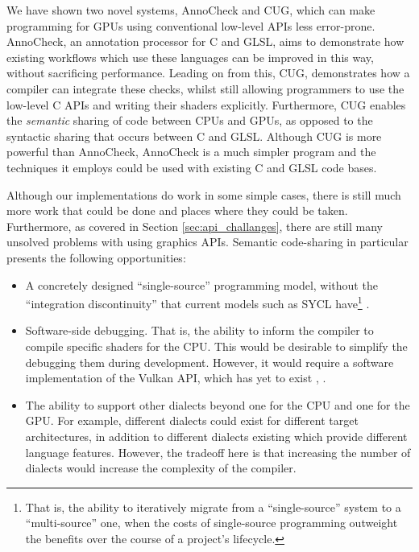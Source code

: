 \documentclass[a4paper,12pt,twoside,openright]{report}
\begin{document}

We have shown two novel systems, AnnoCheck and CUG, which can make programming
for GPUs using conventional low-level APIs less error-prone. AnnoCheck, an
annotation processor for C and GLSL, aims to demonstrate how existing workflows
which use these languages can be improved in this way, without sacrificing
performance. Leading on from this, CUG, demonstrates how a compiler can
integrate these checks, whilst still allowing programmers to use the low-level
C APIs and writing their shaders explicitly. Furthermore, CUG enables the
\textit{semantic} sharing of code between CPUs and GPUs, as opposed to the
syntactic sharing that occurs between C and GLSL. Although CUG is more powerful
than AnnoCheck, AnnoCheck is a much simpler program and the techniques it
employs could be used with existing C and GLSL code bases.

Although our implementations do work in some simple cases, there is still much
more work that could be done and places where they could be taken. Furthermore,
as covered in Section \ref{sec:api_challanges}, there are still many unsolved
problems with using graphics APIs. Semantic code-sharing in particular presents
the following opportunities:

\begin{itemize}

    \item A concretely designed ``single-source'' programming model, without
    the ``integration discontinuity'' that current models such as SYCL
    have\footnote{That is, the ability to iteratively migrate from a
    ``single-source'' system to a ``multi-source'' one, when the costs of
    single-source programming outweight the benefits over the course of a
    project's lifecycle.} \cite{DesignAndEvaluateReusableComponents}.

    \item Software-side debugging. That is, the ability to inform the compiler
    to compile specific shaders for the CPU. This would be desirable to
    simplify the debugging them during development. However, it would require a
    software implementation of the Vulkan API, which has yet to exist
    \cite{VulkanCPU} \cite{Kazan}, \cite{SwiftShaderVulkan}.

    \item The ability to support other dialects beyond one for the CPU and one
    for the GPU. For example, different dialects could exist for different
    target architectures, in addition to different dialects existing which
    provide different language features. However, the tradeoff here is that
    increasing the number of dialects would increase the complexity of the
    compiler.

\end{itemize}
\end{document}
